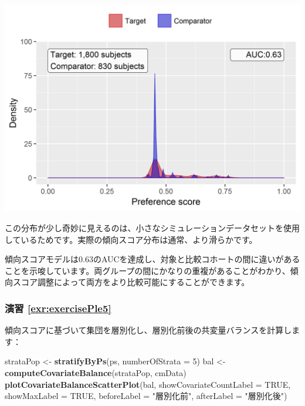 \documentclass[
  11pt]{book}
\newenvironment{Shaded}{\begin{snugshade}}{\end{snugshade}}
\newcommand{\AttributeTok}[1]{\textcolor[rgb]{0.13,0.29,0.53}{#1}}
\newcommand{\ConstantTok}[1]{\textcolor[rgb]{0.56,0.35,0.01}{#1}}
\newcommand{\DecValTok}[1]{\textcolor[rgb]{0.00,0.00,0.81}{#1}}
\newcommand{\FunctionTok}[1]{\textcolor[rgb]{0.13,0.29,0.53}{\textbf{#1}}}
\newcommand{\NormalTok}[1]{#1}
\newcommand{\OtherTok}[1]{\textcolor[rgb]{0.56,0.35,0.01}{#1}}
\newcommand{\StringTok}[1]{\textcolor[rgb]{0.31,0.60,0.02}{#1}}
\theoremstyle{definition}
\theoremstyle{definition}
\theoremstyle{definition}
\theoremstyle{definition}
\theoremstyle{remark}
\begin{document}
\begin{center}\includegraphics[width=0.8\linewidth]{images/SuggestedAnswers/ps} \end{center}

この分布が少し奇妙に見えるのは、小さなシミュレーションデータセットを使用しているためです。実際の傾向スコア分布は通常、より滑らかです。

傾向スコアモデルは0.63のAUCを達成し、対象と比較コホートの間に違いがあることを示唆しています。両グループの間にかなりの重複があることがわかり、傾向スコア調整によって両方をより比較可能にすることができます。

\subsubsection*{演習 \ref{exr:exercisePle5}}\label{ux6f14ux7fd2-refexrexerciseple5}

傾向スコアに基づいて集団を層別化し、層別化前後の共変量バランスを計算します：

\begin{Shaded}
\begin{Highlighting}[]
\NormalTok{strataPop }\OtherTok{\textless{}{-}} \FunctionTok{stratifyByPs}\NormalTok{(ps, }\AttributeTok{numberOfStrata =} \DecValTok{5}\NormalTok{)}
\NormalTok{bal }\OtherTok{\textless{}{-}} \FunctionTok{computeCovariateBalance}\NormalTok{(strataPop, cmData)}
\FunctionTok{plotCovariateBalanceScatterPlot}\NormalTok{(bal,}
                                \AttributeTok{showCovariateCountLabel =} \ConstantTok{TRUE}\NormalTok{,}
                                \AttributeTok{showMaxLabel =} \ConstantTok{TRUE}\NormalTok{,}
                                \AttributeTok{beforeLabel =} \StringTok{"層別化前"}\NormalTok{,}
                                \AttributeTok{afterLabel =} \StringTok{"層別化後"}\NormalTok{)}
\end{Highlighting}
\end{Shaded}
\end{document}
